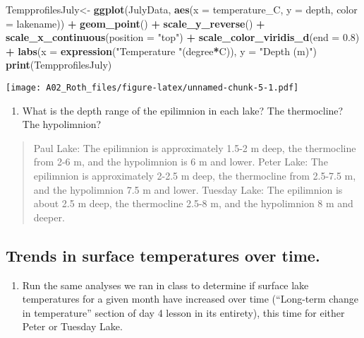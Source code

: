 \documentclass[]{article}
\newenvironment{Shaded}{\begin{snugshade}}{\end{snugshade}}
\newcommand{\DataTypeTok}[1]{\textcolor[rgb]{0.13,0.29,0.53}{#1}}
\newcommand{\FloatTok}[1]{\textcolor[rgb]{0.00,0.00,0.81}{#1}}
\newcommand{\KeywordTok}[1]{\textcolor[rgb]{0.13,0.29,0.53}{\textbf{#1}}}
\newcommand{\NormalTok}[1]{#1}
\newcommand{\OperatorTok}[1]{\textcolor[rgb]{0.81,0.36,0.00}{\textbf{#1}}}
\newcommand{\StringTok}[1]{\textcolor[rgb]{0.31,0.60,0.02}{#1}}
\providecommand{\tightlist}{%
  \setlength{\itemsep}{0pt}\setlength{\parskip}{0pt}}
\begin{document}
\begin{Shaded}
\begin{Highlighting}[]
\NormalTok{TempprofilesJuly<-}\StringTok{ }
\StringTok{  }\KeywordTok{ggplot}\NormalTok{(JulyData, }\KeywordTok{aes}\NormalTok{(}\DataTypeTok{x =}\NormalTok{ temperature_C, }\DataTypeTok{y =}\NormalTok{ depth, }\DataTypeTok{color =}\NormalTok{ lakename)) }\OperatorTok{+}
\StringTok{  }\KeywordTok{geom_point}\NormalTok{() }\OperatorTok{+}
\StringTok{  }\KeywordTok{scale_y_reverse}\NormalTok{() }\OperatorTok{+}
\StringTok{  }\KeywordTok{scale_x_continuous}\NormalTok{(}\DataTypeTok{position =} \StringTok{"top"}\NormalTok{) }\OperatorTok{+}
\StringTok{  }\KeywordTok{scale_color_viridis_d}\NormalTok{(}\DataTypeTok{end =} \FloatTok{0.8}\NormalTok{) }\OperatorTok{+}\StringTok{ }
\StringTok{  }\KeywordTok{labs}\NormalTok{(}\DataTypeTok{x =} \KeywordTok{expression}\NormalTok{(}\StringTok{"Temperature "}\NormalTok{(degree}\OperatorTok{*}\NormalTok{C)), }\DataTypeTok{y =} \StringTok{"Depth (m)"}\NormalTok{)}
\KeywordTok{print}\NormalTok{(TempprofilesJuly)}
\end{Highlighting}
\end{Shaded}

\texttt{[image: A02\_Roth\_files/figure-latex/unnamed-chunk-5-1.pdf]}

\begin{enumerate}
\def\labelenumi{\arabic{enumi}.}
\setcounter{enumi}{9}
\tightlist
\item
  What is the depth range of the epilimnion in each lake? The
  thermocline? The hypolimnion?
\end{enumerate}

\begin{quote}
Paul Lake: The epilimnion is approximately 1.5-2 m deep, the thermocline
from 2-6 m, and the hypolimnion is 6 m and lower. Peter Lake: The
epilimnion is approximately 2-2.5 m deep, the thermocline from 2.5-7.5
m, and the hypolimnion 7.5 m and lower. Tuesday Lake: The epilimnion is
about 2.5 m deep, the thermocline 2.5-8 m, and the hypolimnion 8 m and
deeper.
\end{quote}

\hypertarget{trends-in-surface-temperatures-over-time.}{%
\subsection{Trends in surface temperatures over
time.}\label{trends-in-surface-temperatures-over-time.}}

\begin{enumerate}
\def\labelenumi{\arabic{enumi}.}
\setcounter{enumi}{10}
\tightlist
\item
  Run the same analyses we ran in class to determine if surface lake
  temperatures for a given month have increased over time (``Long-term
  change in temperature'' section of day 4 lesson in its entirety), this
  time for either Peter or Tuesday Lake.
\end{enumerate}
\end{document}
